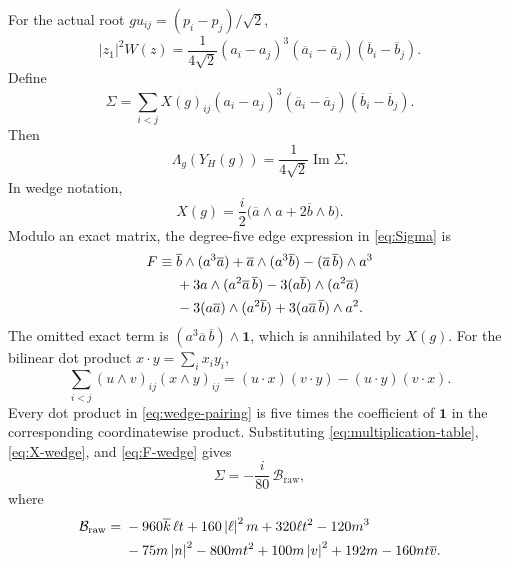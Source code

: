 \documentclass[11pt,reqno]{amsart}
\theoremstyle{remark}
\newcommand{\one}{\mathbf 1}
\newcommand{\abs}[1]{\left\lvert #1\right\rvert}
\begin{document}
For the actual root $gu_{ij}=(p_i-p_j)/\sqrt2$,
\begin{equation}\label{eq:quintic-edge}
\abs{z_1}^2W(z)
=\frac1{4\sqrt2}
(a_i-a_j)^3(\overline a_i-\overline a_j)
(\overline b_i-\overline b_j).
\end{equation}
Define
\begin{equation}\label{eq:Sigma}
\Sigma=\sum_{i<j}X(g)_{ij}
(a_i-a_j)^3(\overline a_i-\overline a_j)
(\overline b_i-\overline b_j).
\end{equation}
Then
\begin{equation}\label{eq:Lambda-H-Sigma}
\Lambda_g(Y_H(g))=\frac1{4\sqrt2}\operatorname{Im}\Sigma.
\end{equation}
In wedge notation,
\begin{equation}\label{eq:X-wedge}
X(g)=\frac i2\bigl(\overline a\wedge a+2\overline b\wedge b\bigr).
\end{equation}
Modulo an exact matrix, the degree-five edge expression in
\eqref{eq:Sigma} is
\begin{align}
F\equiv{}&
\overline b\wedge(a^3\overline a)
+\overline a\wedge(a^3\overline b)
-(\overline a\,\overline b)\wedge a^3\notag\\
&+3a\wedge(a^2\overline a\,\overline b)
-3(a\overline b)\wedge(a^2\overline a)\notag\\
&-3(a\overline a)\wedge(a^2\overline b)
+3(a\overline a\,\overline b)\wedge a^2.
\label{eq:F-wedge}
\end{align}
The omitted exact term is
$(a^3\overline a\,\overline b)\wedge\one$, which is annihilated by $X(g)$.
For the bilinear dot product $x\cdot y=\sum_i x_iy_i$,
\begin{equation}\label{eq:wedge-pairing}
\sum_{i<j}(u\wedge v)_{ij}(x\wedge y)_{ij}
=(u\cdot x)(v\cdot y)-(u\cdot y)(v\cdot x).
\end{equation}
Every dot product in \eqref{eq:wedge-pairing} is five times the coefficient of
$\one$ in the corresponding coordinatewise product.  Substituting
\eqref{eq:multiplication-table}, \eqref{eq:X-wedge}, and
\eqref{eq:F-wedge} gives
\begin{equation}\label{eq:Sigma-Braw}
\Sigma=-\frac i{80}\,\mathcal B_{\mathrm{raw}},
\end{equation}
where
\begin{align}
\mathcal B_{\mathrm{raw}}={}&
-960\overline k\,\ell t
+160\abs\ell^2m
+320\ell t^2
-120m^3\notag\\
&-75m\abs n^2
-800mt^2
+100m\abs v^2
+192m
-160nt\overline v.
\label{eq:Braw}
\end{align}
\end{document}
